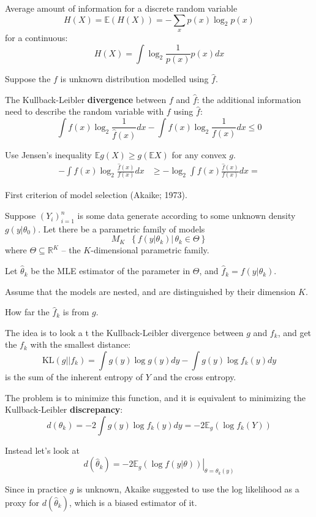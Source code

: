 \documentclass[a4paper]{article}
\newcommand{\obj}[1]{{\left\{ #1 \right \}}}
\newcommand{\brac}[1]{{\left ( #1 \right )}}
\newcommand{\induc}[1]{{\left . #1 \right \vert}}
\newcommand{\Real}{\mathbb{R}}
\newcommand{\Ex}[0]{{\mathbb{E}}}
\newcommand{\defn}{\mathop{\overset{\Delta}{=}}\nolimits}
\begin{document}
Average amount of information for a discrete random variable
\[H(X) = \Ex\brac{H(X)} = - \sum_x p(x) \log_2 p(x)\]
for a continuous:
\[H(X) = \int \log_2\frac{1}{p(x)} p(x) dx\]

Suppose the $f$ is unknown distribution modelled using $\hat{f}$.

The Kullback-Leibler \textbf{divergence} between $f$ and $\hat{f}$: the additional information need to describe the random variable with $f$ using $\hat{f}$: \[\int f(x) \log_2\frac{1}{\hat{f}(x)} dx - \int f(x) \log_2\frac{1}{f(x)} dx \leq 0 \]

Use Jensen's inequality $\Ex g(X) \geq g\brac{\Ex X}$ for any convex $g$.
\begin{align*}
	-\int f(x) \log_2\frac{\hat{f}(x)}{f(x)} dx & \geq -\log_2\int f(x) \frac{\hat{f}(x)}{f(x)}  dx = 
\end{align*}

First criterion of model selection (Akaike; 1973).

Suppose $\brac{Y_i}_{i=1}^n$ is some data generate according to some unknown density $g\brac{\induc{y}\theta_0}$. Let there be a parametric family of models
\[M_K \defn \obj{\induc{f\brac{\induc{y}\theta_k}}\,\theta_k\in \Theta}\]
where $\Theta\subseteq \Real^K$ -- the $K$-dimensional parametric family.

Let $\hat{\theta}_k$ be the MLE estimator of the parameter in $\Theta$, and $\hat{f}_k = f\brac{\induc{y}\theta_k}$.

Assume that the models are nested, and are distinguished by their dimension $K$.

How far the $\hat{f}_k$ is from $g$.

The idea is to look a t the Kullback-Leibler divergence between $g$ and $f_k$, and get the $f_k$ with the smallest distance:
\[\text{KL}(g||f_k) = \int g(y) \log g(y) dy - \int g(y) \log f_k(y) dy\]
is the sum of the inherent entropy of $Y$ and the cross entropy.

The problem is to minimize this function, and it is equivalent to minimizing the Kullback-Leibler \textbf{discrepancy}:
\[d(\theta_k) = -2\int g(y) \log f_k(y) dy = - 2 \Ex_g\brac{\log f_k(Y)}\]

Instead	let's look at
\[d(\hat{\theta}_k) = - 2\induc{\Ex_g\brac{\log f(\induc{y}\theta)}}_{\theta=\theta_k(y)} \]

Since in practice $g$ is unknown, Akaike suggested to use the log likelihood as a proxy for $d(\hat{\theta}_k)$, which is a biased estimator of it.
\end{document}
